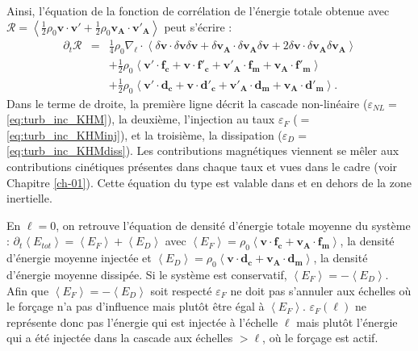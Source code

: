 Ainsi, l'équation de la fonction de corrélation de l'énergie totale obtenue avec $\mathcal{R} = \left<\frac{1}{2} \rho_0 \boldsymbol{v} \cdot \boldsymbol{v'} + \frac{1}{2} \rho_0 \boldsymbol{v_A} \cdot \boldsymbol{v'_A}\right>$ peut s'écrire :
\begin{eqnarray}
\label{eq:turb_inc_KHM}    \partial_t \mathcal{R} &=& \frac{1}{4} \rho_0 \nabla_{\boldsymbol{\ell}} \cdot \left< \delta \boldsymbol{v} \cdot \delta \boldsymbol{v} \delta \boldsymbol{v} + \delta \boldsymbol{v_A} \cdot \delta \boldsymbol{v_A} \delta \boldsymbol{v} + 2 \delta \boldsymbol{v} \cdot \delta \boldsymbol{v_A} \delta \boldsymbol{v_A}\right> \\
 \label{eq:turb_inc_KHMinj}    &&+ \frac{1}{2} \rho_0  \left<\boldsymbol{v'} \cdot \boldsymbol{f_c} + \boldsymbol{v} \cdot \boldsymbol{f'_c} + \boldsymbol{v'_A} \cdot \boldsymbol{f_m} + \boldsymbol{v_A} \cdot \boldsymbol{f'_m}\right> \\
 \label{eq:turb_inc_KHMdiss}    &&+ \frac{1}{2} \rho_0 \left<\boldsymbol{v'} \cdot \boldsymbol{d_c} +\boldsymbol{v} \cdot \boldsymbol{d'_c} + \boldsymbol{v'_A} \cdot \boldsymbol{d_m} + \boldsymbol{v_A} \cdot \boldsymbol{d'_m}\right>.
\end{eqnarray}
Dans le terme de droite, la première ligne décrit la cascade non-linéaire ($\varepsilon_{NL} = $  \eqref{eq:turb_inc_KHM}), la deuxième, l'injection au taux $\varepsilon_F$ ($=$ \eqref{eq:turb_inc_KHMinj}), et la troisième, la dissipation ($\varepsilon_D =$  \eqref{eq:turb_inc_KHMdiss}). Les contributions magnétiques viennent se mêler aux contributions cinétiques présentes dans chaque taux et vues dans le cadre  (voir Chapitre \ref{ch-01}).  Cette équation du type  est valable dans et en dehors de la zone inertielle. 

En $\boldsymbol{\ell} = 0$, on retrouve l'équation de densité d'énergie totale moyenne du système : $\partial_t \left<E_{tot}\right> = \left<E_F\right> + \left<E_D\right>$ avec $\left<E_F\right> = \rho_0 \left<\boldsymbol{v} \cdot \boldsymbol{f_c} + \boldsymbol{v_A} \cdot \boldsymbol{f_m} \right>$, la densité d'énergie moyenne injectée et $\left<E_D\right> = \rho_0 \left<\boldsymbol{v} \cdot \boldsymbol{d_c} + \boldsymbol{v_A} \cdot \boldsymbol{d_m}\right>$, la densité d'énergie moyenne dissipée. 
Si le système est conservatif, $\left<E_F\right> = -  \left<E_D\right> $. Afin que $\left<E_F\right> = -  \left<E_D\right>$ soit respecté $\varepsilon_F$ ne doit pas s'annuler aux échelles où le forçage n'a pas d'influence mais plutôt être égal à $\left<E_F\right>$. $\varepsilon_F (\ell)$ ne représente donc pas l'énergie qui est injectée à l'échelle $\ell$ mais plutôt l'énergie qui a été injectée dans la cascade aux échelles $>\ell$, où le forçage est actif.


